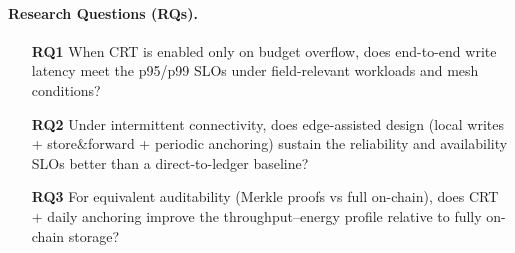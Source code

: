 \documentclass[12pt,onecolumn]{IEEEtran} %
\begin{document}
\paragraph{Research Questions (RQs).}
\begin{enumerate}
  \item[\textbf{RQ1}] When CRT is enabled only on budget overflow, does end-to-end write latency meet the p95/p99 SLOs under field-relevant workloads and mesh conditions?
  \item[\textbf{RQ2}] Under intermittent connectivity, does edge-assisted design (local writes + store\&forward + periodic anchoring) sustain the reliability and availability SLOs better than a direct-to-ledger baseline?
  \item[\textbf{RQ3}] For equivalent auditability (Merkle proofs vs full on-chain), does CRT + daily anchoring improve the throughput--energy profile relative to fully on-chain storage?
\end{enumerate}
\end{document}
